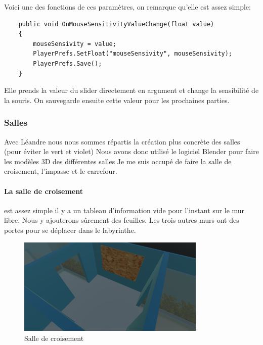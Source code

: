 \documentclass{article}
\begin{document}
\newpage

Voici une des fonctions de ces paramètres, on remarque qu'elle est assez simple:

\par\vspace{0.2cm}
\begin{lstlisting}
    public void OnMouseSensitivityValueChange(float value)
    {
        mouseSensivity = value;
        PlayerPrefs.SetFloat("mouseSensivity", mouseSensivity);
        PlayerPrefs.Save();
    }
\end{lstlisting}

Elle prends la valeur du slider directement en argument et change la sensibilité de la souris. On sauvegarde ensuite cette valeur pour les prochaines parties.

\subsubsection{Salles}
Avec Léandre nous nous sommes répartis la création plus concrète des salles (pour éviter le vert et violet) Nous avons donc utilisé le logiciel Blender pour faire les modèles 3D des différentes salles
Je me suis occupé de faire la salle de croisement, l'impasse et le carrefour.

\paragraph{La salle de croisement}\hspace{-0.2cm}est assez simple il y a un tableau d'information vide pour l'instant sur le mur libre. Nous y ajouterons sûrement des feuilles. Les trois autres murs ont des portes pour se déplacer dans le labyrinthe.

\begin{figure}[!h]
    \centering
    \includegraphics[width=0.8\textwidth]{salle_croisement.png}
    \caption{Salle de croisement}
    \label{salle de croisement}
\end{figure}
\end{document}
